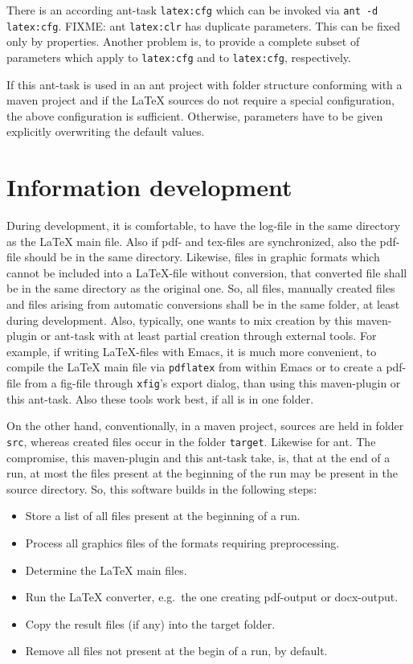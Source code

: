 \documentclass[12pt]{book}
\newcommand{\gls}[1]{#1}
\begin{document}
There is an according ant-task \texttt{latex:cfg} 
which can be invoked via \texttt{ant -d latex:cfg}. 
FIXME\@: ant  \texttt{latex:clr} has duplicate parameters. 
This can be fixed only by properties. 
Another problem is, to provide a complete subset of parameters 
which apply to \texttt{latex:cfg} and to \texttt{latex:cfg}, respectively. 

If this ant-task is used in an ant project 
with folder structure conforming with a maven project 
and if the \LaTeX{} sources do not require a special configuration, 
the above configuration is sufficient. 
Otherwise, parameters have to be given explicitly 
overwriting the default values. 

\section{Information development }\label{sec:devel}

During development, it is comfortable, 
to have the log-file in the same directory as the \LaTeX{} main file. 
Also if pdf- and tex-files are synchronized, 
also the pdf-file should be in the same directory. 
Likewise, files in graphic formats 
which cannot be included into a \LaTeX-file without conversion, 
that converted file shall be in the same directory as the original one. 
So, all files, manually created files 
and files arising from automatic conversions 
shall be in the same folder, at least during development. 
Also, typically, one wants to mix creation by this maven-plugin or ant-task 
with at least partial creation through external tools. 
For example, if writing \LaTeX-files with Emacs, 
it is much more convenient, to compile the \LaTeX{} main file 
via \texttt{pdflatex} from within Emacs 
or to create a pdf-file from a \gls{fig}-file 
through \texttt{xfig}'s export dialog, 
than using this maven-plugin or this ant-task. 
Also these tools work best, if all is in one folder. 

On the other hand, 
conventionally, in a maven project, 
sources are held in folder \texttt{src}, 
whereas created files occur in the folder \texttt{target}. 
Likewise for ant. 
The compromise, this maven-plugin and this ant-task take, 
is, that at the end of a run, 
at most the files present at the beginning of the run 
may be present in the source directory. 
So, this software builds in the following steps: 
%
\begin{itemize}
\item
Store a list of all files present at the beginning of a run.
\item
Process all graphics files of the formats requiring preprocessing.
\item
Determine the \LaTeX{} main files.
\item
Run the \LaTeX{} converter, e.g.~the one creating pdf-output or docx-output.
\item
Copy the result files (if any) into the target folder.
\item
Remove all files not present at the begin of a run, by default. 
\end{itemize}
\end{document}
